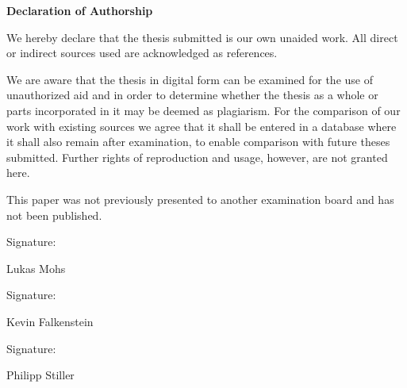 \mbox{}

\vspace{5cm}
\begin{LARGE}
\textbf{Declaration of Authorship}
\end{LARGE}
\vspace{1cm}

\begingroup

We hereby declare that the thesis submitted is our own unaided work. All direct or indirect sources used are acknowledged as references.

We are aware that the thesis in digital form can be examined for the use of unauthorized aid and in order to determine whether the thesis as a whole or parts incorporated in it may be deemed as plagiarism. For the comparison of our work with existing sources we agree that it shall be entered in a database where it shall also remain after examination, to enable comparison with future theses submitted. Further rights of reproduction and usage, however, are not granted here.

This paper was not previously presented to another examination board and has not been published.

\vspace{3cm}


Signature: \hrulefill
\hspace*{0mm}\phantom{Approved: }

\hspace*{0mm}\phantom{Approved: }Lukas Mohs

\vspace{1cm}
Signature: \hrulefill
\hspace*{0mm}\phantom{Approved: }

\hspace*{0mm}\phantom{Approved: }Kevin Falkenstein

\vspace{1cm}
Signature: \hrulefill
\hspace*{0mm}\phantom{Approved: }

\hspace*{0mm}\phantom{Approved: }Philipp Stiller 


\endgroup